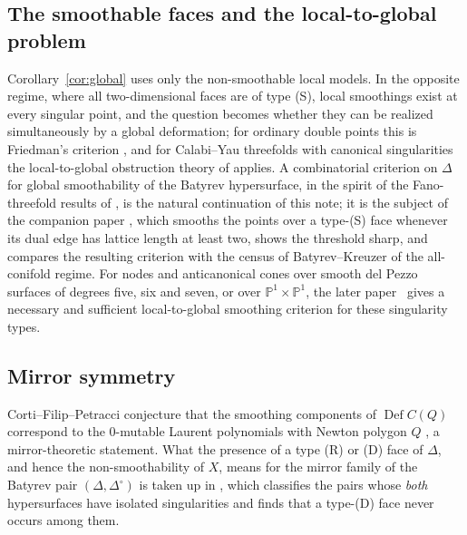 \documentclass[11pt]{amsart}
\theoremstyle{definition}
\theoremstyle{remark}
\newcommand{\PP}{\mathbb{P}}
\newcommand{\Def}{\operatorname{Def}}
\begin{document}
\subsection{The smoothable faces and the local-to-global problem}
Corollary~\ref{cor:global} uses only the non-smoothable local models.  In the
opposite regime, where all two-dimensional faces are of type \textup{(S)},
local
smoothings exist at every singular point, and the question becomes whether
they can be realized simultaneously by a global deformation; for ordinary
double points this is Friedman's criterion \cite{Friedman86}, and for
Calabi--Yau threefolds with canonical singularities the local-to-global
obstruction theory of \cite{Gross97,Namikawa02} applies.  A combinatorial
criterion on $\Delta$ for global smoothability of the Batyrev hypersurface,
in the spirit of the Fano-threefold results of \cite{Petracci20,CHP24}, is
the natural continuation of this note; it is the subject of the companion
paper \cite{paper2}, which smooths the points over a type-\textup{(S)} face
whenever its dual edge has lattice length at least two, shows the threshold
sharp, and compares the resulting criterion with the census of
Batyrev--Kreuzer \cite{BK10} of the all-conifold regime.
For nodes and anticanonical cones over smooth del Pezzo surfaces of
degrees five, six and seven, or over $\PP^1\times\PP^1$, the later
paper~\cite{paper5} gives a necessary and sufficient local-to-global
smoothing criterion for these singularity types.

\subsection{Mirror symmetry}
Corti--Filip--Petracci conjecture that the smoothing components of
$\Def C(Q)$ correspond to the $0$-mutable Laurent polynomials with Newton
polygon $Q$ \cite{CFP}, a mirror-theoretic statement.  What the presence of
a type \textup{(R)} or \textup{(D)} face of $\Delta$, and hence the
non-smoothability of $X$, means for the mirror family of the Batyrev pair
$(\Delta, \Delta^\circ)$ is taken up in \cite{paper3}, which classifies the
pairs whose \emph{both} hypersurfaces have isolated singularities and finds
that a type-\textup{(D)} face never occurs among them.
\end{document}

